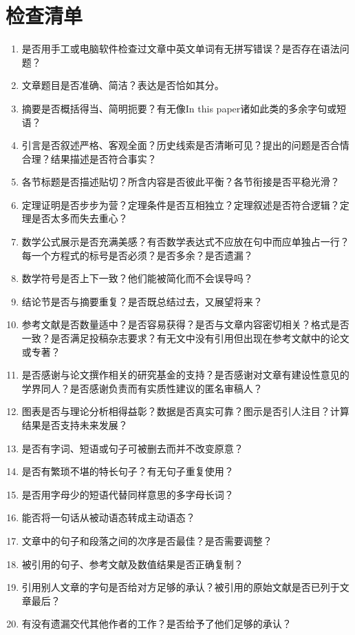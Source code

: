 \documentclass[11pt,final]{article}
\numberwithin{equation}{section}
\begin{document}
\section{检查清单}
\begin{enumerate}
	\item 是否用手工或电脑软件检查过文章中英文单词有无拼写错误？是否存在语法问题？
	\item 文章题目是否准确、简洁？表达是否恰如其分。
	\item 摘要是否概括得当、简明扼要？有无像In this paper诸如此类的多余字句或短语？
	\item 引言是否叙述严格、客观全面？历史线索是否清晰可见？提出的问题是否合情合理？结果描述是否符合事实？
	\item 各节标题是否描述贴切？所含内容是否彼此平衡？各节衔接是否平稳光滑？
	\item 定理证明是否步步为营？定理条件是否互相独立？定理叙述是否符合逻辑？定理是否太多而失去重心？
	\item 数学公式展示是否充满美感？有否数学表达式不应放在句中而应单独占一行？每一个方程式的标号是否必须？是否多余？是否遗漏？
	\item 数学符号是否上下一致？他们能被简化而不会误导吗？
	\item 结论节是否与摘要重复？是否既总结过去，又展望将来？
	\item 参考文献是否数量适中？是否容易获得？是否与文章内容密切相关？格式是否一致？是否满足投稿杂志要求？有无文中没有引用但出现在参考文献中的论文或专著？
	\item 是否感谢与论文撰作相关的研究基金的支持？是否感谢对文章有建设性意见的学界同人？是否感谢负责而有实质性建议的匿名审稿人？
	\item 图表是否与理论分析相得益彰？数据是否真实可靠？图示是否引人注目？计算结果是否支持未来发展？
	\item 是否有字词、短语或句子可被删去而并不改变原意？
	\item 是否有繁琐不堪的特长句子？有无句子重复使用？
	\item 是否用字母少的短语代替同样意思的多字母长词？
	\item 能否将一句话从被动语态转成主动语态？
	\item 文章中的句子和段落之间的次序是否最佳？是否需要调整？
	\item 被引用的句子、参考文献及数值结果是否正确复制？
	\item 引用别人文章的字句是否给对方足够的承认？被引用的原始文献是否已列于文章最后？
	\item 有没有遗漏交代其他作者的工作？是否给予了他们足够的承认？
\end{enumerate}
\end{document}
